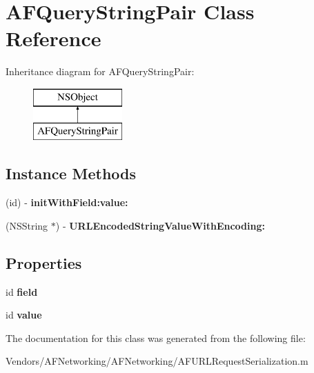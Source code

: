 \hypertarget{interface_a_f_query_string_pair}{}\section{A\+F\+Query\+String\+Pair Class Reference}
\label{interface_a_f_query_string_pair}
Inheritance diagram for A\+F\+Query\+String\+Pair\+:\begin{figure}[H]
\begin{center}
\leavevmode
\includegraphics[height=2.000000cm]{interface_a_f_query_string_pair}
\end{center}
\end{figure}
\subsection*{Instance Methods}
\begin{DoxyCompactItemize}
\item 
\hypertarget{interface_a_f_query_string_pair_a959f4cb1984075c5325c6e2e6266ae0f}{}(id) -\/ {\bfseries init\+With\+Field\+:value\+:}\label{interface_a_f_query_string_pair_a959f4cb1984075c5325c6e2e6266ae0f}

\item 
\hypertarget{interface_a_f_query_string_pair_a1fb00452b65de6c63f228c52f57b583b}{}(N\+S\+String $\ast$) -\/ {\bfseries U\+R\+L\+Encoded\+String\+Value\+With\+Encoding\+:}\label{interface_a_f_query_string_pair_a1fb00452b65de6c63f228c52f57b583b}

\end{DoxyCompactItemize}
\subsection*{Properties}
\begin{DoxyCompactItemize}
\item 
\hypertarget{interface_a_f_query_string_pair_a56a6a5052194b3fd862dc7eed618a646}{}id {\bfseries field}\label{interface_a_f_query_string_pair_a56a6a5052194b3fd862dc7eed618a646}

\item 
\hypertarget{interface_a_f_query_string_pair_a8aafaee91dab273d51a9448bfb4e7676}{}id {\bfseries value}\label{interface_a_f_query_string_pair_a8aafaee91dab273d51a9448bfb4e7676}

\end{DoxyCompactItemize}


The documentation for this class was generated from the following file\+:\begin{DoxyCompactItemize}
\item 
Vendors/\+A\+F\+Networking/\+A\+F\+Networking/A\+F\+U\+R\+L\+Request\+Serialization.\+m\end{DoxyCompactItemize}
